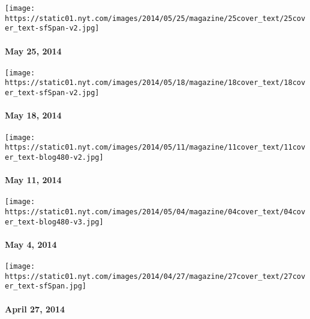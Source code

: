 \href{http://www.nytimes.com/indexes/2014/05/25/magazine/index.html}{}

\texttt{[image: https://static01.nyt.com/images/2014/05/25/magazine/25cover\_text/25cover\_text-sfSpan-v2.jpg]}

\hypertarget{may-25-2014}{%
\paragraph{May 25, 2014}\label{may-25-2014}}

\href{http://www.nytimes.com/indexes/2014/05/18/magazine/index.html}{}

\texttt{[image: https://static01.nyt.com/images/2014/05/18/magazine/18cover\_text/18cover\_text-sfSpan-v2.jpg]}

\hypertarget{may-18-2014}{%
\paragraph{May 18, 2014}\label{may-18-2014}}

\href{http://www.nytimes.com/indexes/2014/05/11/magazine/index.html}{}

\texttt{[image: https://static01.nyt.com/images/2014/05/11/magazine/11cover\_text/11cover\_text-blog480-v2.jpg]}

\hypertarget{may-11-2014}{%
\paragraph{May 11, 2014}\label{may-11-2014}}

\href{http://www.nytimes.com/indexes/2014/05/04/magazine/index.html}{}

\texttt{[image: https://static01.nyt.com/images/2014/05/04/magazine/04cover\_text/04cover\_text-blog480-v3.jpg]}

\hypertarget{may-4-2014}{%
\paragraph{May 4, 2014}\label{may-4-2014}}

\href{http://www.nytimes.com/indexes/2014/04/27/magazine/index.html}{}

\texttt{[image: https://static01.nyt.com/images/2014/04/27/magazine/27cover\_text/27cover\_text-sfSpan.jpg]}

\hypertarget{april-27-2014}{%
\paragraph{April 27, 2014}\label{april-27-2014}}

